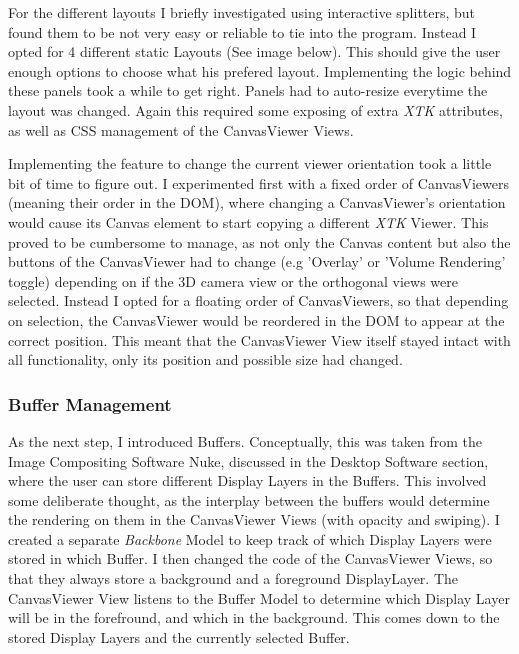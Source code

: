 \documentclass[a4paper,11pt,twoside]{article}
\begin{document}
For the different layouts I briefly investigated using interactive splitters, but found them to be not very easy or reliable to tie into the program. Instead I opted for 4 different static Layouts (See image below). This should give the user enough options to choose what his prefered layout. Implementing the logic behind these panels took a while to get right. Panels had to auto-resize everytime the layout was changed. Again this required some exposing of extra \textit{XTK} attributes, as well as CSS management of the CanvasViewer Views.

Implementing the feature to change the current viewer orientation took a little bit of time to figure out. I experimented first with a fixed order of CanvasViewers (meaning their order in the DOM), where changing a CanvasViewer's orientation would cause its Canvas element to start copying a different \textit{XTK} Viewer. This proved to be cumbersome to manage, as not only the Canvas content but also the buttons of the CanvasViewer had to change (e.g 'Overlay' or 'Volume Rendering' toggle) depending on if the 3D camera view or the orthogonal views were selected. Instead I opted for a floating order of CanvasViewers, so that depending on selection, the CanvasViewer would be reordered in the DOM to appear at the correct position. This meant that the CanvasViewer View itself stayed intact with all functionality, only its position and possible size had changed.


\subsubsection{Buffer Management}

As the next step, I introduced Buffers. Conceptually, this was taken from the Image Compositing Software Nuke, discussed in the Desktop Software section, where the user can store different Display Layers in the Buffers. This involved some deliberate thought, as the interplay between the buffers would determine the rendering on them in the CanvasViewer Views (with opacity and swiping). I created a separate \textit{Backbone} Model to keep track of which Display Layers were stored in which Buffer. I then changed the code of the CanvasViewer Views, so that they always store a background and a foreground DisplayLayer. The CanvasViewer View listens to the Buffer Model to determine which Display Layer will be in the forefround, and which in the background. This comes down to the stored Display Layers and the currently selected Buffer. 
\end{document}
